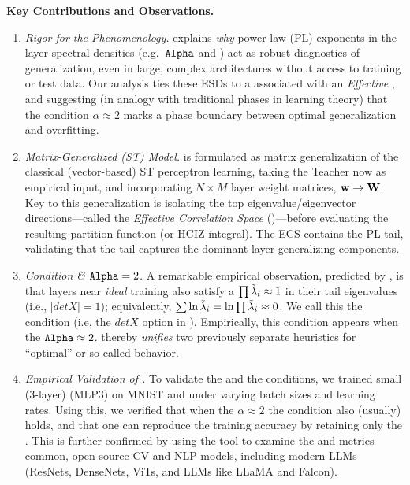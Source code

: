 \vspace{1em}
\noindent
\textbf{Key Contributions and Observations.}
\begin{enumerate}[label=\Alph*.]
\item 
\emph{Rigor for the \HTSR Phenomenology.}
\SETOL explains \emph{why} power-law (PL) exponents in the layer spectral densities (e.g.\ $\texttt{Alpha}$ and 
\ALPHAHAT) act as robust diagnostics of generalization, even in large, complex architectures without access 
to training or test data. Our analysis ties these \HeavyTailed ESDs to a \ScaleInvariant  \VolumePreservingTransformation
associated with an \emph{Effective} \FreeEnergy, and
suggesting (in analogy with traditional \STATMECH phases in learning theory)
that the \HTSR condition $\alpha\approx 2$ marks a
phase boundary between optimal generalization and overfitting.

\item 
\emph{Matrix-Generalized \StudentTeacher (ST) Model.}
\SETOL is formulated as \SemiEmpirical matrix generalization of
the classical (vector-based) ST perceptron learning,  taking the Teacher now as empirical input, and incorporating $N\times M$ layer 
weight matrices, ${\mathbf{w}}\rightarrow{\mathbf{W}}$.
Key to this generalization is isolating the top eigenvalue/eigenvector directions---called the
\emph{Effective Correlation Space} (\ECS)---before evaluating the resulting partition function (or HCIZ 
integral). The ECS contains the \HTSR PL tail, validating that the tail captures the dominant layer generalizing components.

\item 
\emph{\TRACELOG Condition \& $\texttt{Alpha}=2$.}
A remarkable empirical observation, predicted by \SETOL, is that layers near \emph{ideal} training also satisfy a 
$\prod \tilde{\lambda}_{i} \approx 1$ in their tail eigenvalues (i.e., $|detX|=1$); equivalently, $\sum \ln\tilde{\lambda}_{i} = \ln\prod \tilde{\lambda}_{i} \approx 0$.
We call this the \TRACELOG condition (i.e, the $detX$ option in \WW).
Empirically, this condition appears when the \HTSR $\texttt{Alpha} \approx 2$. \SETOL thereby \emph{unifies} two 
previously separate heuristics for “optimal” or so-called \Ideal  behavior.

\item 
  \emph{Empirical Validation of \SETOL.}
To validate the \TRACELOG and the \ECS conditions, we trained small (3-layer) \MultiLayerPerceptron (MLP3)
on MNIST and under varying batch sizes and learning rates.  Using this, we verified that
when the \HTSR $\alpha\approx 2$ the \SETOL \TRACELOG condition also (usually) holds,
and that one can reproduce the training accuracy by retaining only the \ECS.
This is further confirmed by using the \WW tool to examine the \ALPHA and \DETX metrics
common, open-source CV and NLP  models, including modern LLMs 
(ResNets, DenseNets,    ViTs, and LLMs like LLaMA and Falcon).


\end{enumerate}
